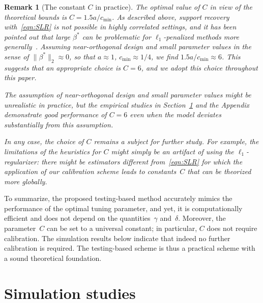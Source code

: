 \documentclass{elsarticle}
\newtheorem*{remark}{Remark}
\newcommand{\oldnew}{}
\newcommand{\revision}[1]{#1}
\newcommand\norm[1]{\lVert#1\rVert}
\newcommand{\ratio}{a}
\newcommand{\constA}{C}
\begin{document}
{\oldnew
\begin{remark}[The constant $\constA$ in practice]
 \revision{The optimal value of $\constA$ in view of the theoretical bounds is $\constA=1.5\ratio/ c_{\min}$.
As described above, support recovery with~\eqref{eqn:SLR} is not possible in highly correlated settings, and it has been pointed out that large $\beta^*$ can be problematic for $\ell_1$-penalized methods more generally~\citep{dalalyan2017prediction}.
Assuming near-orthogonal design and small parameter values in the sense of $\norm{\beta^*}_2\approx 0$, so that $\ratio\approx 1$, $c_{\min}\approx 1/4$, we find  $1.5 \ratio/c_{\min}\approx 6$.
This suggests that an appropriate choice is $\constA=6$, and we adopt this choice throughout this paper.

The assumption of near-orthogonal design and small parameter values might be unrealistic in practice,
but the empirical studies in Section~\ref{sec:sim} and the Appendix demonstrate good performance of $\constA=6$ even when the model deviates substantially from this assumption.

In any case, the choice of $\constA$ remains a subject for further study.
For example, the limitations of the heuristics for $\constA$  might simply be an artifact of using the $\ell_1$-regularizer:
there might be estimators different from~\eqref{eqn:SLR} for which the application of our calibration scheme leads to constants~$\constA$ that can be theorized more globally.
}
\end{remark}
To summarize, the proposed testing-based method accurately mimics the performance of the optimal tuning parameter, and yet, it is computationally efficient and does not depend on the quantities~$\gamma$ and~$\delta.$ Moreover, the parameter~$\constA$ can be set to a universal constant; in particular, $\constA$ does not require calibration. The simulation results below indicate that indeed no further calibration is required. The testing-based scheme is thus a practical scheme with a sound theoretical foundation.
}
\section{Simulation studies}\label{sec:sim}
\end{document}
